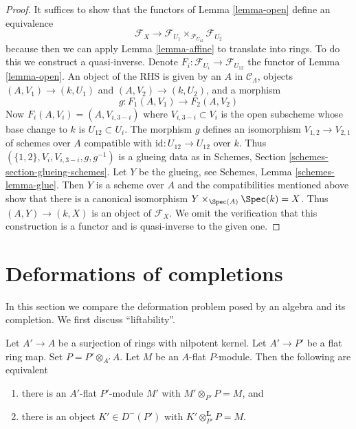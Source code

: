 \begin{proof}
It suffices to show that the functors of Lemma \ref{lemma-open}
define an equivalence
$$
\mathcal{F}_X \longrightarrow
\mathcal{F}_{U_1} \times_{\mathcal{F}_{U_{12}}} \mathcal{F}_{U_2}
$$
because then we can apply Lemma \ref{lemma-affine} to translate into rings.
To do this we construct a quasi-inverse. Denote
$F_i : \mathcal{F}_{U_i} \to \mathcal{F}_{U_{12}}$
the functor of Lemma \ref{lemma-open}.
An object of the RHS is given by an $A$ in $\mathcal{C}_\Lambda$,
objects $(A, V_1) \to (k, U_1)$ and $(A, V_2) \to (k, U_2)$, and
a morphism
$$
g : F_1(A, V_1) \to F_2(A, V_2)
$$
Now $F_i(A, V_i) = (A, V_{i, 3 - i})$ where $V_{i, 3 - i} \subset V_i$
is the open subscheme whose base change to $k$ is $U_{12} \subset U_i$.
The morphism $g$ defines an isomorphism
$V_{1, 2} \to V_{2, 1}$ of schemes over $A$ compatible
with $\text{id} : U_{12} \to U_{12}$ over $k$.
Thus $(\{1, 2\}, V_i, V_{i, 3 - i}, g, g^{-1})$ is a glueing
data as in Schemes, Section \ref{schemes-section-glueing-schemes}.
Let $Y$ be the glueing, see Schemes, Lemma \ref{schemes-lemma-glue}.
Then $Y$ is a scheme over $A$ and the
compatibilities mentioned above show that
there is a canonical isomorphism
$Y \times_{\Spec(A)} \Spec(k) = X$.
Thus $(A, Y) \to (k, X)$ is an object of $\mathcal{F}_X$.
We omit the verification that this construction is a functor
and is quasi-inverse to the given one.
\end{proof}






\section{Deformations of completions}
\label{section-compare}

\noindent
In this section we compare the deformation problem posed
by an algebra and its completion.
We first discuss ``liftability''.

\begin{lemma}
\label{lemma-lift-equivalence-module-derived}
Let $A' \to A$ be a surjection of rings with nilpotent kernel.
Let $A' \to P'$ be a flat ring map.
Set $P = P' \otimes_{A'} A$.
Let $M$ be an $A$-flat $P$-module.
Then the following are equivalent
\begin{enumerate}
\item there is an $A'$-flat $P'$-module $M'$ with
$M' \otimes_{P'} P = M$, and
\item there is an object $K' \in D^-(P')$ with
$K' \otimes_{P'}^\mathbf{L} P = M$.
\end{enumerate}
\end{lemma}

